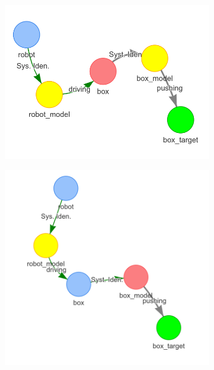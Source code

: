 \begin{figure}[H]
    \centering
    \begin{subfigure}{.3\textwidth}
    \centering
    \includegraphics[width=1.05\textwidth]{figures/proposed_method/connecting_nodes/robot_push/robot_push_5}
    \caption{}\label{subfig:robot_push_6}
    \end{subfigure}
    \begin{subfigure}{.3\textwidth}
    \centering
    \includegraphics[width=1.05\textwidth]{figures/proposed_method/connecting_nodes/robot_push/robot_push_6}
    \caption{}\label{subfig:robot_push_7}
    \end{subfigure}


\end{figure}
